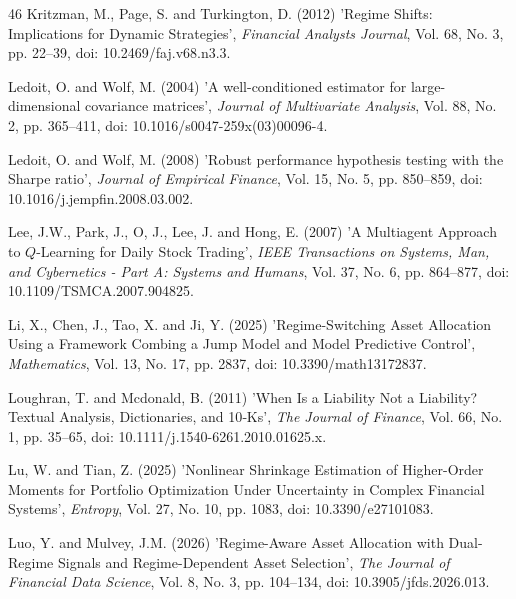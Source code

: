\documentclass{singlecol-new}
\theoremstyle{TH}{
\newtheorem{lemma}{Lemma}
\newtheorem{theorem}[lemma]{Theorem}
\newtheorem{corrolary}[lemma]{Corrolary}
\newtheorem{conjecture}[lemma]{Conjecture}
\newtheorem{proposition}[lemma]{Proposition}
\newtheorem{claim}[lemma]{Claim}
\newtheorem{stheorem}[lemma]{Wrong Theorem}
\newtheorem{algorithm}{Algorithm}
}
\theoremstyle{THrm}{
\newtheorem{definition}{Definition}[section]
\newtheorem{question}{Question}[section]
\newtheorem{remark}{Remark}
\newtheorem{scheme}{Scheme}
}
\theoremstyle{THhit}{
\newtheorem{case}{Case}[section]
}
\begin{document}
\begin{thebibliography}{46}
Kritzman, M., Page, S. and Turkington, D. (2012) 'Regime Shifts: Implications for Dynamic Strategies', {\it Financial Analysts Journal}, Vol. 68, No. 3, pp. 22--39, doi: 10.2469/faj.v68.n3.3.

Ledoit, O. and Wolf, M. (2004) 'A well-conditioned estimator for large-dimensional covariance matrices', {\it Journal of Multivariate Analysis}, Vol. 88, No. 2, pp. 365--411, doi: 10.1016/s0047-259x(03)00096-4.

Ledoit, O. and Wolf, M. (2008) 'Robust performance hypothesis testing with the Sharpe ratio', {\it Journal of Empirical Finance}, Vol. 15, No. 5, pp. 850--859, doi: 10.1016/j.jempfin.2008.03.002.

Lee, J.W., Park, J., O, J., Lee, J. and Hong, E. (2007) 'A Multiagent Approach to $Q$-Learning for Daily Stock Trading', {\it IEEE Transactions on Systems, Man, and Cybernetics - Part A: Systems and Humans}, Vol. 37, No. 6, pp. 864--877, doi: 10.1109/TSMCA.2007.904825.

Li, X., Chen, J., Tao, X. and Ji, Y. (2025) 'Regime-Switching Asset Allocation Using a Framework Combing a Jump Model and Model Predictive Control', {\it Mathematics}, Vol. 13, No. 17, pp. 2837, doi: 10.3390/math13172837.

Loughran, T. and Mcdonald, B. (2011) 'When Is a Liability Not a Liability? Textual Analysis, Dictionaries, and 10‐Ks', {\it The Journal of Finance}, Vol. 66, No. 1, pp. 35--65, doi: 10.1111/j.1540-6261.2010.01625.x.

Lu, W. and Tian, Z. (2025) 'Nonlinear Shrinkage Estimation of Higher-Order Moments for Portfolio Optimization Under Uncertainty in Complex Financial Systems', {\it Entropy}, Vol. 27, No. 10, pp. 1083, doi: 10.3390/e27101083.

Luo, Y. and Mulvey, J.M. (2026) 'Regime-Aware Asset Allocation with Dual-Regime Signals and Regime-Dependent Asset Selection', {\it The Journal of Financial Data Science}, Vol. 8, No. 3, pp. 104--134, doi: 10.3905/jfds.2026.013.


\end{thebibliography}
\end{document}
